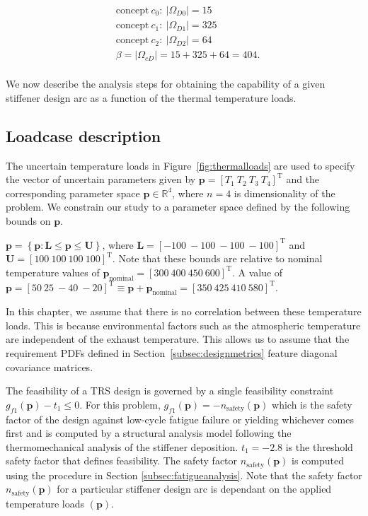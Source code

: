 \begin{equation*}
	\begin{aligned}
		& \mathrm{concept~}c_0:~|\Omega_{D0}| = 15\\
		& \mathrm{concept~}c_1:~|\Omega_{D1}| = 325\\
		& \mathrm{concept~}c_2:~|\Omega_{D2}| = 64\\
		& \beta = |\Omega_{cD}| = 15 + 325 + 64 = 404.\\
	\end{aligned}
\end{equation*}

We now describe the analysis steps for obtaining the capability of a given stiffener design arc as a function of the thermal temperature loads.

\subsection{Loadcase description} \label{subsec:loadcase}

The uncertain temperature loads in Figure~\ref{fig:thermalloads} are used to specify the vector of uncertain parameters given by $\mathbf{p} = \left[T_1 ~ T_2 ~ T_3 ~ T_4\right]^{\mathrm{T}}$ and the corresponding parameter space $\mathbf{p}\in\mathbb{R}^4$, where $n = 4$ is dimensionality of the problem. We constrain our study to a parameter space defined by the following bounds on $\mathbf{p}$.

$\mathbf{p} = \left\{\mathbf{p}: \mathbf{L} \le \mathbf{p} \le \mathbf{U}\right\}$, where $\mathbf{L} = \left[-100 ~ -100 ~ -100 ~ -100\right]^{\mathrm{T}}$ and $\mathbf{U} = \left[100 ~ 100 ~ 100 ~ 100\right]^{\mathrm{T}}$. Note that these bounds are relative to nominal temperature values of $\mathbf{p}_{\textrm{nominal}} = \left[300 ~ 400 ~ 450 ~ 600\right]^{\mathrm{T}}$. A value of $\mathbf{p} = \left[50 ~ 25 ~ -40 ~ -20\right]^{\mathrm{T}} \equiv \mathbf{p} + \mathbf{p}_{\textrm{nominal}} = \left[350 ~ 425 ~ 410 ~ 580\right]^{\mathrm{T}}$.

In this chapter, we assume that there is no correlation between these temperature loads. This is because environmental factors such as the atmospheric temperature are independent of the exhaust temperature. This allows us to assume that the requirement \acp{PDF} defined in Section~\ref{subsec:designmetrics} feature diagonal covariance matrices.

The feasibility of a \ac{TRS} design is governed by a single feasibility constraint $g_{f1}(\mathbf{p}) - t_1 \le 0$. For this problem, $g_{f1}(\mathbf{p}) = -n_{\textrm{safety}}(\mathbf{p})$ which is the safety factor of the design against low-cycle fatigue failure or yielding whichever comes first and is computed by a structural analysis model following the thermomechanical analysis of the stiffener deposition. $t_1 = -2.8$ is the threshold safety factor that defines feasibility. The safety factor $n_{\textrm{safety}}(\mathbf{p})$ is computed using the procedure in Section \ref{subsec:fatigueanalysis}. Note that the safety factor $n_{\textrm{safety}}(\mathbf{p})$ for a particular stiffener design arc is dependant on the applied temperature loads $(\mathbf{p})$.

